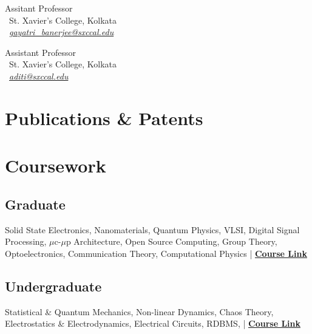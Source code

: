 \documentclass[]{psyqe-resume-openfont}
\begin{document}
\begin{minipage}[t]{0.34\textwidth}
\sectionsep

\location{\textcolor{primary}{Prof. Gayatri Banerjee}}
Assitant Professor \\
 \ St. Xavier's College, Kolkata \\
  \  \href{mailto:gayatri_banerjee@sxccal.edu}{\textit{gayatri\_banerjee@sxccal.edu}}

\sectionsep

\location{\textcolor{primary}{Prof. Aditi Ghosh}}
Assistant Professor \\
 \ St. Xavier's College, Kolkata \\
 \ 
\href{mailto:aditi@sxccal.edu}{\textit{aditi@sxccal.edu}}
%
%
\end{minipage} 
\hfill
\begin{minipage}[t]{0.64\textwidth} 

\section{Publications \& Patents} 
\renewcommand\refname{\vskip -1.5em} %


\nocite{*}
\sectionsep


\section{Coursework}
\subsection{Graduate}
Solid State Electronics, 
Nanomaterials, Quantum Physics, 
VLSI, Digital Signal Processing, $\mu$c-$\mu$p Architecture, Open Source Computing, Group Theory, Optoelectronics, Communication Theory, Computational Physics  | \href{https://www.sxccal.edu/wp-content/uploads/2019/12/MSc-PhysicsSyllabus2014.pdf}{\bfseries Course Link}
\sectionsep

\subsection{Undergraduate}
Statistical \& Quantum Mechanics, Non-linear Dynamics, Chaos Theory, Electrostatics \& Electrodynamics, Electrical Circuits, RDBMS,  | \href{https://www.sxccal.edu/wp-content/uploads/2020/01/BscPhysicsHonsSyllabus.pdf}{\bfseries Course Link}

\end{minipage}
\end{document}
